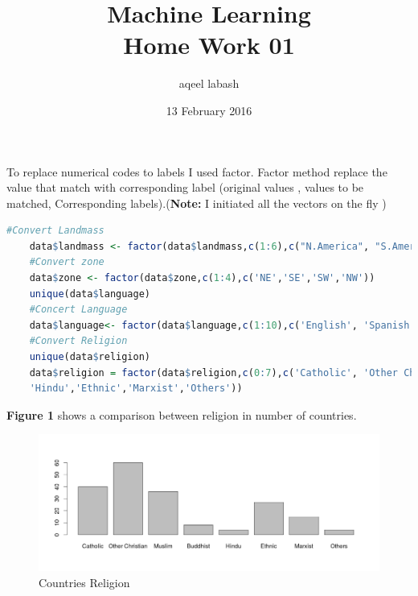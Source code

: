 \documentclass{article}
\title{Machine Learning\\ Home Work 01}
\author{aqeel labash}
\date{13 February 2016}
\begin{document}
	
	\maketitle
	\section*{}
	\subsection*{}
	To replace numerical codes to labels I used factor. Factor method replace the value that match with corresponding label (original values , values to be matched, Corresponding labels).(\textbf{Note: }I initiated all the vectors on the fly )
	\begin{lstlisting}[language=R]
	#Convert Landmass
	data$landmass <- factor(data$landmass,c(1:6),c("N.America", "S.America", "Europe", "Africa", "Asia", "Oceania"))
	#Convert zone
	data$zone <- factor(data$zone,c(1:4),c('NE','SE','SW','NW'))
	unique(data$language)
	#Concert Language
	data$language<- factor(data$language,c(1:10),c('English', 'Spanish', 'French','German','Slavic','Other Indo-European', 'Chinese', 'Arabic','Japanese/Turkish/Finnish/Magyar', 'Others'))
	#Convert Religion
	unique(data$religion)
	data$religion = factor(data$religion,c(0:7),c('Catholic', 'Other Christian','Muslim','Buddhist',
	'Hindu','Ethnic','Marxist','Others'))
	\end{lstlisting}
	\textbf{Figure 1} shows a comparison between religion in number of countries.
	\begin{figure}[H]
		\begin{center}
			\includegraphics[scale=0.5]{barplotreligion.png} %
		\end{center}
		\caption{Countries Religion} %
	\end{figure}
	
\end{document}
